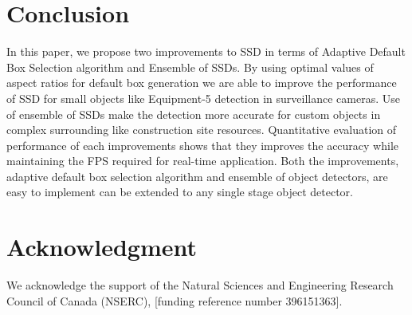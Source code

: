 \documentclass[conference]{IEEEtran}
\begin{document}
\section{Conclusion}
In this paper, we propose two improvements to SSD in terms of Adaptive Default Box Selection algorithm and Ensemble of SSDs. By using optimal values of aspect ratios for default box generation we are able to improve the performance of SSD for small objects like Equipment-5 detection in surveillance cameras. Use of ensemble of SSDs make the detection more accurate for custom objects in complex surrounding like construction site resources. Quantitative evaluation of performance of each improvements shows that they improves the accuracy while maintaining the FPS required for real-time application. Both the improvements, adaptive default box selection algorithm and ensemble of object detectors, are easy to implement can be extended to any single stage object detector.  

\section*{Acknowledgment}

We acknowledge the support of the Natural Sciences and Engineering Research Council of Canada (NSERC), [funding reference number 396151363].


\end{document}
